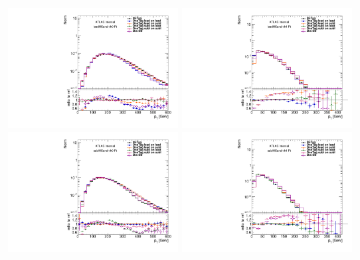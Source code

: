\begin{figure}[htbp!]
\begin{center}
\includegraphics[width=0.4\textwidth,angle=-90]{figures/boosted/Prereweight/2bs_directcompare_leadHCand_trk0_Pt_1.pdf}
\includegraphics[width=0.4\textwidth,angle=-90]{figures/boosted/Prereweight/2bs_directcompare_leadHCand_trk1_Pt_1.pdf}\\
\includegraphics[width=0.4\textwidth,angle=-90]{figures/boosted/Prereweight/2bs_directcompare_sublHCand_trk0_Pt_1.pdf}
\includegraphics[width=0.4\textwidth,angle=-90]{figures/boosted/Prereweight/2bs_directcompare_sublHCand_trk1_Pt_1.pdf}\\

\end{center}
\end{figure}
